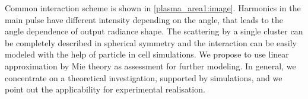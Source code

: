 Common interaction scheme is shown in \autoref{plasma_area1:image}. Harmonics in the main pulse have different intensity depending on the angle, that leads to the angle dependence of output radiance shape. The scattering by a single cluster can be completely described in spherical symmetry and the interaction can be easily modeled with the help of particle in cell simulations. We propose to use linear approximation by Mie theory as assessment for further modeling. In general, we concentrate on a theoretical investigation, supported by simulations, and we point out the applicability for experimental realisation.

